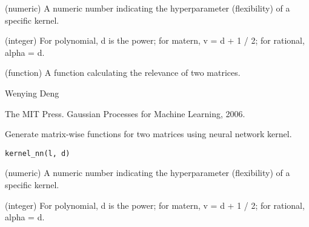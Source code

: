 \documentclass[a4paper]{book}
\begin{document}
%
\begin{Arguments}
\begin{ldescription}
\item[\code{l}] (numeric) A numeric number indicating the hyperparameter
(flexibility) of a specific kernel.

\item[\code{d}] (integer) For polynomial, d is the power; for matern, v = d + 1 /
2; for rational, alpha = d.
\end{ldescription}
\end{Arguments}
%
\begin{Details}\relax
{}
\end{Details}
%
\begin{Value}
\begin{ldescription}
\item[\code{matrix\_wise}] (function) A function calculating the relevance
of two matrices.
\end{ldescription}
\end{Value}
%
\begin{Author}\relax
Wenying Deng
\end{Author}
%
\begin{References}\relax
The MIT Press. Gaussian Processes for Machine Learning, 2006.
\end{References}
%
\begin{Description}\relax
Generate matrix-wise functions for two matrices using neural network kernel.
\end{Description}
%
\begin{Usage}
\begin{verbatim}
kernel_nn(l, d)
\end{verbatim}
\end{Usage}
%
\begin{Arguments}
\begin{ldescription}
\item[\code{l}] (numeric) A numeric number indicating the hyperparameter
(flexibility) of a specific kernel.

\item[\code{d}] (integer) For polynomial, d is the power; for matern, v = d + 1 /
2; for rational, alpha = d.
\end{ldescription}
\end{Arguments}
\end{document}
